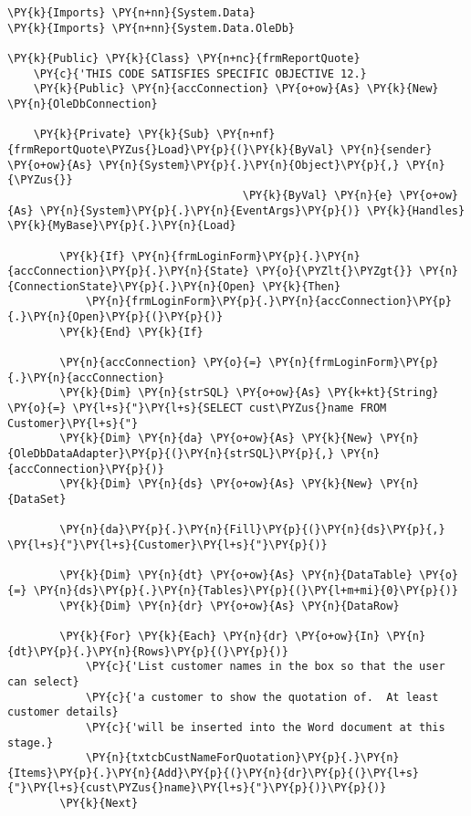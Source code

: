\begin{Verbatim}[commandchars=\\\{\}]
\PY{k}{Imports} \PY{n+nn}{System.Data}
\PY{k}{Imports} \PY{n+nn}{System.Data.OleDb}

\PY{k}{Public} \PY{k}{Class} \PY{n+nc}{frmReportQuote}
    \PY{c}{'THIS CODE SATISFIES SPECIFIC OBJECTIVE 12.}
    \PY{k}{Public} \PY{n}{accConnection} \PY{o+ow}{As} \PY{k}{New} \PY{n}{OleDbConnection}

    \PY{k}{Private} \PY{k}{Sub} \PY{n+nf}{frmReportQuote\PYZus{}Load}\PY{p}{(}\PY{k}{ByVal} \PY{n}{sender} \PY{o+ow}{As} \PY{n}{System}\PY{p}{.}\PY{n}{Object}\PY{p}{,} \PY{n}{\PYZus{}}
                                    \PY{k}{ByVal} \PY{n}{e} \PY{o+ow}{As} \PY{n}{System}\PY{p}{.}\PY{n}{EventArgs}\PY{p}{)} \PY{k}{Handles} \PY{k}{MyBase}\PY{p}{.}\PY{n}{Load}

        \PY{k}{If} \PY{n}{frmLoginForm}\PY{p}{.}\PY{n}{accConnection}\PY{p}{.}\PY{n}{State} \PY{o}{\PYZlt{}\PYZgt{}} \PY{n}{ConnectionState}\PY{p}{.}\PY{n}{Open} \PY{k}{Then}
            \PY{n}{frmLoginForm}\PY{p}{.}\PY{n}{accConnection}\PY{p}{.}\PY{n}{Open}\PY{p}{(}\PY{p}{)}
        \PY{k}{End} \PY{k}{If}

        \PY{n}{accConnection} \PY{o}{=} \PY{n}{frmLoginForm}\PY{p}{.}\PY{n}{accConnection}
        \PY{k}{Dim} \PY{n}{strSQL} \PY{o+ow}{As} \PY{k+kt}{String} \PY{o}{=} \PY{l+s}{"}\PY{l+s}{SELECT cust\PYZus{}name FROM Customer}\PY{l+s}{"}
        \PY{k}{Dim} \PY{n}{da} \PY{o+ow}{As} \PY{k}{New} \PY{n}{OleDbDataAdapter}\PY{p}{(}\PY{n}{strSQL}\PY{p}{,} \PY{n}{accConnection}\PY{p}{)}
        \PY{k}{Dim} \PY{n}{ds} \PY{o+ow}{As} \PY{k}{New} \PY{n}{DataSet}

        \PY{n}{da}\PY{p}{.}\PY{n}{Fill}\PY{p}{(}\PY{n}{ds}\PY{p}{,} \PY{l+s}{"}\PY{l+s}{Customer}\PY{l+s}{"}\PY{p}{)}

        \PY{k}{Dim} \PY{n}{dt} \PY{o+ow}{As} \PY{n}{DataTable} \PY{o}{=} \PY{n}{ds}\PY{p}{.}\PY{n}{Tables}\PY{p}{(}\PY{l+m+mi}{0}\PY{p}{)}
        \PY{k}{Dim} \PY{n}{dr} \PY{o+ow}{As} \PY{n}{DataRow}

        \PY{k}{For} \PY{k}{Each} \PY{n}{dr} \PY{o+ow}{In} \PY{n}{dt}\PY{p}{.}\PY{n}{Rows}\PY{p}{(}\PY{p}{)}
            \PY{c}{'List customer names in the box so that the user can select}
            \PY{c}{'a customer to show the quotation of.  At least customer details}
            \PY{c}{'will be inserted into the Word document at this stage.}
            \PY{n}{txtcbCustNameForQuotation}\PY{p}{.}\PY{n}{Items}\PY{p}{.}\PY{n}{Add}\PY{p}{(}\PY{n}{dr}\PY{p}{(}\PY{l+s}{"}\PY{l+s}{cust\PYZus{}name}\PY{l+s}{"}\PY{p}{)}\PY{p}{)}
        \PY{k}{Next}


\end{Verbatim}
